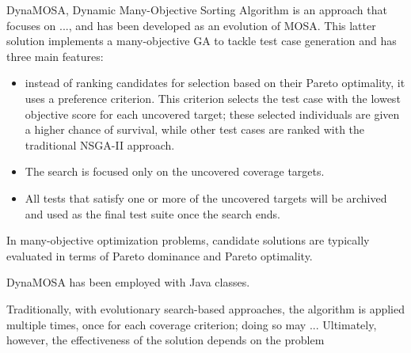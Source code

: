 DynaMOSA, Dynamic Many-Objective Sorting Algorithm \cite{article1} is an approach that focuses on ..., and has been developed as an evolution of MOSA. This latter solution implements a many-objective GA to tackle test case generation and has three main features: 
\begin{itemize}
    \item instead of ranking candidates for selection based on their Pareto optimality, it uses a preference criterion. This criterion selects the test case with the lowest objective score for each uncovered target; these selected individuals are given a higher chance of survival, while other test cases are ranked with the traditional NSGA-II approach.
    \item The search is focused only on the uncovered coverage targets.
    \item All tests that satisfy one or more of the uncovered targets will be archived and used as the final test suite once the search ends.
\end{itemize}

In many-objective optimization problems, candidate solutions are typically evaluated in terms of Pareto dominance and Pareto optimality.


DynaMOSA has been employed with Java classes.

Traditionally, with evolutionary search-based approaches, the algorithm is applied multiple times,  once for each coverage criterion; doing so may ... Ultimately, however, the effectiveness of the solution depends on the problem